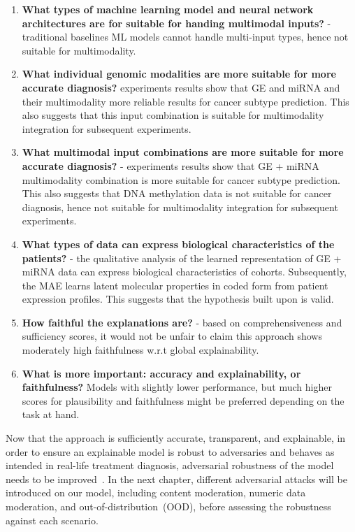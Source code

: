 \begin{enumerate}[noitemsep]
    \item \textbf{What types of machine learning model and neural network architectures are for suitable for handing multimodal inputs?} - traditional baselines ML models cannot handle multi-input types, hence not suitable for multimodality. 
    \item \textbf{What individual genomic modalities are more suitable for more accurate diagnosis?} experiments results show that GE and miRNA and their multimodality more reliable results for cancer subtype prediction. This also suggests that this input combination is suitable for multimodality integration for subsequent experiments. 
    \item \textbf{What multimodal input combinations are more suitable for more accurate diagnosis?} - experiments results show that GE + miRNA multimodality combination is more suitable for cancer subtype prediction. This also suggests that DNA methylation data is not suitable for cancer diagnosis, hence not suitable for multimodality integration for subsequent experiments.
    \item \textbf{What types of data can express biological characteristics of the patients?} - the qualitative analysis of the learned representation of GE + miRNA data can express biological characteristics of cohorts. Subsequently, the MAE learns latent molecular properties in coded form from patient expression profiles. This suggests that the hypothesis built upon is valid. 
    \item \textbf{How faithful the explanations are?} - based on comprehensiveness and sufficiency scores, it would not be unfair to claim this approach shows moderately high faithfulness w.r.t global explainability.   
    \item \textbf{What is more important: accuracy and explainability, or faithfulness?} Models with slightly lower performance, but much higher scores for plausibility and faithfulness might be preferred depending on the task at hand. 
\end{enumerate}

\hspace*{3.5mm} Now that the approach is sufficiently accurate, transparent, and explainable, in order to ensure an explainable model is robust to adversaries and behaves as intended in real-life treatment diagnosis, adversarial robustness of the model needs to be improved~\cite{bhatt2020explainable}. In the next chapter, different adversarial attacks will be introduced on our model, including content moderation, numeric data moderation, and out-of-distribution~(OOD), before assessing the robustness against each scenario. 
